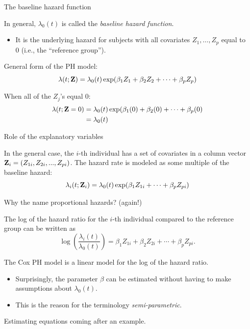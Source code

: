 \documentclass[ignorenonframetext,]{beamer}
\providecommand{\tightlist}{%
  \setlength{\itemsep}{0pt}\setlength{\parskip}{0pt}}
\begin{document}
\begin{frame}{%
\protect\hypertarget{the-baseline-hazard-function}{%
The baseline hazard function}}

In general, \(\lambda_0(t)\) is called the \emph{baseline hazard
function}.

\begin{itemize}
\tightlist
\item
  It is the underlying hazard for subjects with all covariates
  \(Z_1, \ldots ,Z_p\) equal to 0 (i.e., the “reference group”).
\end{itemize}

General form of the PH model:
\[\lambda(t;{\bf Z}) =  \lambda_0(t) \exp(\beta_1 Z_1 + \beta_2 Z_2 + \cdots + \beta_p Z_p) \]

When all of the \(Z_j\)’s equal 0: \begin{align*}
\lambda(t;{\bf Z} = 0) &= \lambda_0(t) \exp(\beta_1(0) + \beta_2(0) + \cdots + \beta_p(0)\\
&= \lambda_0(t)
\end{align*}

\end{frame}

\begin{frame}{%
\protect\hypertarget{role-of-the-explanatory-variables}{%
Role of the explanatory variables}}

In the general case, the \(i\)-th individual has a set of covariates in
a column vector \({\bf Z}_i=(Z_{1i}, Z_{2i},..., Z_{pi})\). The hazard
rate is modeled as some multiple of the baseline hazard:
\[ \lambda_i(t;{\bf Z}_i) = \lambda_0(t) \exp(\beta_1 Z_{1i} + \cdots + \beta_p Z_{pi})\]

\end{frame}

\begin{frame}{%
\protect\hypertarget{why-the-name-proportional-hazards-again}{%
Why the name proportional hazards? (again!)}}

The log of the hazard ratio for the \(i\)-th individual compared to the
reference group can be written as
\[\log \left(\frac{\lambda_i(t)}{\lambda_0(t)}\right) 
= \beta_1 Z_{1i} + \beta_2 Z_{2i} + \cdots + \beta_p Z_{pi}. \]

The Cox PH model is a linear model for the log of the hazard ratio.

\begin{itemize}
\item
  Surprisingly, the parameter \(\beta\) can be estimated without having
  to make assumptions about \(\lambda_0(t)\).
\item
  This is the reason for the terminology \emph{semi-parametric}.
\end{itemize}

Estimating equations coming after an example.

\end{frame}
\end{document}
